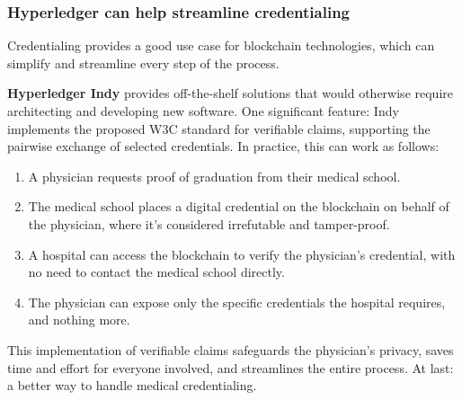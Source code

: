 \subsubsection{Hyperledger can help streamline credentialing}

Credentialing provides a good use case for blockchain technologies,
which can simplify and streamline every step of the process.

\textbf{Hyperledger Indy} provides off-the-shelf solutions that would
otherwise require architecting and developing new software. One
significant feature: Indy implements the proposed W3C standard for
verifiable claims, supporting the pairwise exchange of selected
credentials. In practice, this can work as follows:

\begin{enumerate}
\item A physician requests proof of graduation from their medical school.

\item The medical school places a digital credential on the blockchain
on behalf of the physician, where it's considered irrefutable and
tamper-proof.

\item A hospital can access the blockchain to verify the physician's
credential, with no need to contact the medical school directly.

\item The physician can expose only the specific credentials the
hospital requires, and nothing more.
\end{enumerate}

This implementation of verifiable claims safeguards the physician's
privacy, saves time and effort for everyone involved, and streamlines
the entire process. At last: a better way to handle medical
credentialing.
